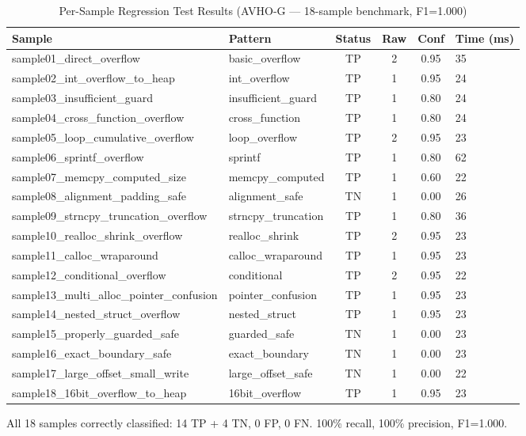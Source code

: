 \begin{table}[htbp]
  \centering
  \caption{Per-Sample Regression Test Results (AVHO-G — 18-sample benchmark, F1=1.000)}
  \label{tab:persample}
  \begin{tabular}{llcccl}
    \toprule
    \textbf{Sample} & \textbf{Pattern} & \textbf{Status} & \textbf{Raw} & \textbf{Conf} & \textbf{Time (ms)} \\
    \midrule
    sample01\_direct\_overflow & basic\_overflow & TP & 2 & 0.95 & 35 \\
    sample02\_int\_overflow\_to\_heap & int\_overflow & TP & 1 & 0.95 & 24 \\
    sample03\_insufficient\_guard & insufficient\_guard & TP & 1 & 0.80 & 24 \\
    sample04\_cross\_function\_overflow & cross\_function & TP & 1 & 0.80 & 24 \\
    sample05\_loop\_cumulative\_overflow & loop\_overflow & TP & 2 & 0.95 & 23 \\
    sample06\_sprintf\_overflow & sprintf & TP & 1 & 0.80 & 62 \\
    sample07\_memcpy\_computed\_size & memcpy\_computed & TP & 1 & 0.60 & 22 \\
    sample08\_alignment\_padding\_safe & alignment\_safe & TN & 1 & 0.00 & 26 \\
    sample09\_strncpy\_truncation\_overflow & strncpy\_truncation & TP & 1 & 0.80 & 36 \\
    sample10\_realloc\_shrink\_overflow & realloc\_shrink & TP & 2 & 0.95 & 23 \\
    sample11\_calloc\_wraparound & calloc\_wraparound & TP & 1 & 0.95 & 23 \\
    sample12\_conditional\_overflow & conditional & TP & 2 & 0.95 & 22 \\
    sample13\_multi\_alloc\_pointer\_confusion & pointer\_confusion & TP & 1 & 0.95 & 23 \\
    sample14\_nested\_struct\_overflow & nested\_struct & TP & 1 & 0.95 & 23 \\
    sample15\_properly\_guarded\_safe & guarded\_safe & TN & 1 & 0.00 & 23 \\
    sample16\_exact\_boundary\_safe & exact\_boundary & TN & 1 & 0.00 & 23 \\
    sample17\_large\_offset\_small\_write & large\_offset\_safe & TN & 1 & 0.00 & 22 \\
    sample18\_16bit\_overflow\_to\_heap & 16bit\_overflow & TP & 1 & 0.95 & 23 \\
    \bottomrule
  \end{tabular}

  \small * All 18 samples correctly classified: 14 TP + 4 TN, 0 FP, 0 FN. 100\% recall, 100\% precision, F1=1.000.
\end{table}

